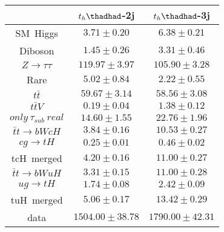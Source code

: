 \centering
\begin{tabular}{ccc} \toprule\toprule
 & $t_{h}\thadhad$-2j & $t_{h}\thadhad$-3j\\ \midrule
SM~Higgs & $3.71\pm0.20$ & $6.38\pm0.21$\\
Diboson & $1.45\pm0.26$ & $3.31\pm0.46$\\
$Z\to\tau\tau$ & $119.97\pm3.97$ & $105.90\pm3.28$\\
Rare & $5.02\pm0.84$ & $2.22\pm0.55$\\
$t\bar{t}$ & $59.67\pm3.14$ & $58.56\pm3.08$\\
$t\bar{t}V$ & $0.19\pm0.04$ & $1.38\pm0.12$\\
$only~\tau_{sub}~real$ & $14.60\pm1.55$ & $22.76\pm1.96$\\\midrule\midrule
$\bar{t}t\to bWcH$ & $3.84\pm0.16$ & $10.53\pm0.27$\\
$cg\to tH$ & $0.25\pm0.01$ & $0.46\pm0.02$\\
tcH~merged & $4.20\pm0.16$ & $11.00\pm0.27$\\\midrule
$\bar{t}t\to bWuH$ & $3.31\pm0.15$ & $11.00\pm0.28$\\
$ug\to tH$ & $1.74\pm0.08$ & $2.42\pm0.09$\\
tuH~merged & $5.06\pm0.17$ & $13.42\pm0.29$\\\midrule\midrule
data & $1504.00\pm38.78$ & $1790.00\pm42.31$\\
\bottomrule\bottomrule
\end{tabular}
